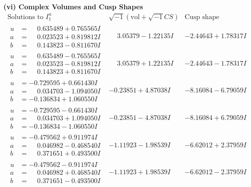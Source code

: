 \documentclass[1p]{elsarticle_modified}
\theoremstyle{definition}
\newcommand{\I}{\sqrt{-1}}
\begin{document}
\newpage\flushleft \textbf{(vi) Complex Volumes and Cusp Shapes}
$$\begin{array}{c|c|c}  
\text{Solutions to }I^u_{1}& \I (\text{vol} + \sqrt{-1}CS) & \text{Cusp shape}\\
 \hline 
\begin{aligned}
u &= \phantom{-}0.635489 + 0.765565 I \\
a &= \phantom{-}0.023523 + 0.819812 I \\
b &= \phantom{-}0.143823 - 0.811670 I\end{aligned}
 & \phantom{-}3.05379 - 1.22135 I & -2.44643 + 1.78317 I \\ \hline\begin{aligned}
u &= \phantom{-}0.635489 - 0.765565 I \\
a &= \phantom{-}0.023523 - 0.819812 I \\
b &= \phantom{-}0.143823 + 0.811670 I\end{aligned}
 & \phantom{-}3.05379 + 1.22135 I & -2.44643 - 1.78317 I \\ \hline\begin{aligned}
u &= -0.729595 + 0.661430 I \\
a &= \phantom{-}0.034703 - 1.094050 I \\
b &= -0.136834 + 1.060550 I\end{aligned}
 & -0.23851 + 4.87038 I & -8.16084 - 6.79059 I \\ \hline\begin{aligned}
u &= -0.729595 - 0.661430 I \\
a &= \phantom{-}0.034703 + 1.094050 I \\
b &= -0.136834 - 1.060550 I\end{aligned}
 & -0.23851 - 4.87038 I & -8.16084 + 6.79059 I \\ \hline\begin{aligned}
u &= -0.479562 + 0.911974 I \\
a &= \phantom{-}0.046982 - 0.468540 I \\
b &= \phantom{-}0.371651 + 0.493500 I\end{aligned}
 & -1.11923 - 1.98539 I & -6.62012 + 2.37959 I \\ \hline\begin{aligned}
u &= -0.479562 - 0.911974 I \\
a &= \phantom{-}0.046982 + 0.468540 I \\
b &= \phantom{-}0.371651 - 0.493500 I\end{aligned}
 & -1.11923 + 1.98539 I & -6.62012 - 2.37959 I \\ \hline\begin{aligned}

\end{aligned}
\end{array}$$
\end{document}
